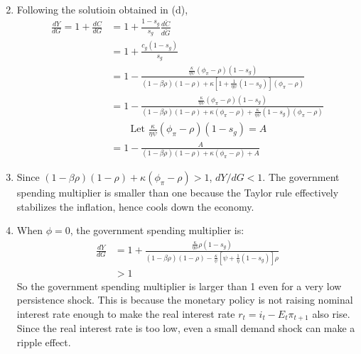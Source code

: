 \documentclass[11pt]{amsart}
\begin{document}
\begin{enumerate}[label = (\alph*)]
\begin{align*}
	\end{align*}
	\item Following the solutioin obtained in (d), 
	\begin{align*}
	\frac{d Y}{d G} =  1 + \frac{d C}{d G} &= 1 + \frac{1-s_g}{s_g} \frac{d \check{ C }}{d \check{ G }} \\
	& = 1 + \frac{c_g (1-s_g)}{s_g} \\
	& = 1 - \frac {  \frac { \kappa } { \eta \psi } \left( \phi _ { \pi } - \rho \right) (1-s _ { g }) } { \left( 1 -  \beta \rho \right) ( 1- \rho ) + \kappa \left[ 1 + \frac { 1} { \eta \psi } \left( 1- s _ { g } \right) \right] \left( \phi _ { \pi } - \rho \right) } \\
	& = 1 - \frac {  \frac { \kappa } { \eta \psi } \left( \phi _ { \pi } - \rho \right) (1-s _ { g }) } { \left( 1 -  \beta \rho \right) ( 1- \rho ) + \kappa(\phi_\pi - \rho) + \frac { \kappa } { \eta \psi } \left( 1- s _ { g } \right)  \left( \phi _ { \pi } - \rho \right) } \\
	& \qquad \text{Let } \frac { \kappa } { \eta \psi } \left( \phi _ { \pi } - \rho \right) (1-s _ { g }) = A \\
	& = 1 - \frac{A}{\left( 1 -  \beta \rho \right) ( 1- \rho ) + \kappa(\phi_\pi - \rho) + A} 
	\end{align*}
	\item Since $\left( 1 -  \beta \rho \right) ( 1- \rho ) + \kappa(\phi_\pi - \rho) >1$, $	dY / dG  < 1$. The government spending multiplier is smaller than one because the Taylor rule effectively stabilizes the inflation, hence cools down the economy.
	\item When $\phi = 0$, the government spending multiplier is:
	\begin{align*}
	\frac{d Y}{d G} &=  1 + \frac{\frac{\kappa}{\eta \phi} \rho(1-s_g)}{(1-\beta \rho)(1-\rho) - \frac{\kappa}{\psi} \left[ \psi + \frac{1}{\eta} (1-s_g) \right] \rho } \\
	& > 1
	\end{align*}
	So the government spending multiplier is larger than 1 even for a very low persistence shock. This is because the monetary policy is not raising nominal interest rate enough to make the real interest rate $r_t = i_t - E_t \pi_{t+1}$ also rise. Since the real interest rate is too low, even a small demand shock can make a ripple effect. 
	

\end{enumerate}
\end{document}
